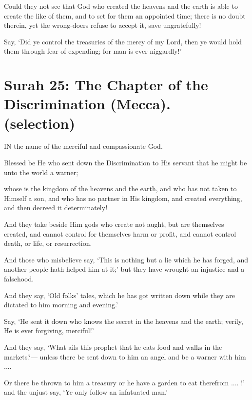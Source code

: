 \documentclass[fontsize=14pt, letterpaper, notitlepage, openany, DIV=12]{scrbook} %
\begin{document}
\noindent[17:99]
Could they not see that God who created the heavens and the earth is able to create the
like of them, and to set for them an appointed time; there is no doubt therein, yet the wrong-doers
refuse to accept it, save ungratefully!

\noindent[17:100]
Say, `Did ye control the treasuries of the mercy of my Lord, then ye would hold them
through fear of expending; for man is ever niggardly!'


\section[Surah 25: The Chapter of the Discrimination (Mecca).]{Surah 25: The Chapter of the Discrimination (Mecca).\\ (selection)}


IN the name of the merciful and compassionate God.

\noindent[25:1]
Blessed be He who sent down the Discrimination to His servant that he might be unto the
world a warner;

\noindent[25:2]
whose is the kingdom of the heavens and the earth, and who has not taken to Himself a
son, and who has no partner in His kingdom, and created everything, and then decreed it
determinately!

\noindent[25:3]
And they take beside Him gods who create not aught, but are themselves created, and
cannot control for themselves harm or profit, and cannot control death, or life, or resurrection.

\noindent[25:4]
And those who misbelieve say, `This is nothing but a lie which he has forged, and
another people hath helped him at it;' but they have wrought an injustice and a falsehood.

\noindent[25:5]
And they say, `Old folks' tales, which he has got written down while they are dictated to
him morning and evening.'

\noindent[25:6]
Say, `He sent it down who knows the secret in the heavens and the earth; verily, He is
ever forgiving, merciful!'

\noindent[25:7]
And they say, `What ails this prophet that he eats food and walks in the markets?---
unless there be sent down to him an angel and be a warner with him ....

\noindent[25:8]
Or there be thrown to him a treasury or he have a garden to eat therefrom .... !' and the
unjust say, `Ye only follow an infatuated man.'
\end{document}
